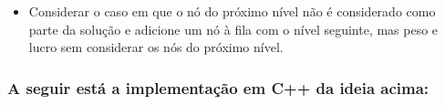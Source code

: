 \begin{itemize}
    \item Considerar o caso em que o nó do próximo nível não é considerado como parte da solução e adicione um nó à fila com o nível seguinte, mas peso e lucro sem considerar os nós do próximo nível. 
\end{itemize}

\subsubsection*{A seguir está a implementação em C++ da ideia acima:}


